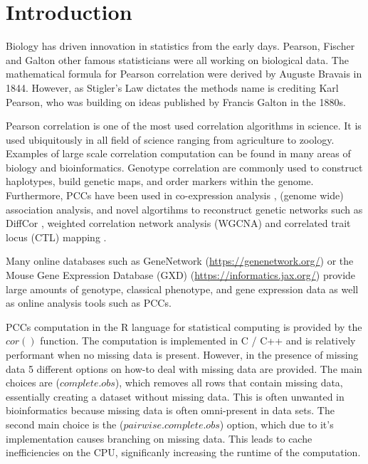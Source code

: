 \documentclass{bioinfo}
\begin{document}
\maketitle

\section{Introduction}
Biology has driven innovation in statistics from the early days. Pearson, Fischer 
and Galton other famous statisticians were all working on biological data. The 
mathematical formula for Pearson correlation were derived by Auguste Bravais in 
1844. However, as Stigler's Law \citep{Stigler1980} dictates the methods name is 
crediting Karl Pearson, who was building on ideas published by Francis Galton in 
the 1880s. 

Pearson correlation is one of the most used correlation algorithms in science. 
It is used ubiquitously in all field of science ranging from agriculture to 
zoology. Examples of large scale correlation computation can be found in many 
areas of biology and bioinformatics. Genotype correlation are commonly used to 
construct haplotypes, build genetic maps, and order markers within the genome. 
Furthermore, PCCs have been used in co-expression analysis \citep{Tesson:2010}, 
(genome wide) association analysis, and novel algortihms to reconstruct genetic 
networks such as DiffCor \citep{Fukushima:2013}, weighted correlation network 
analysis (WGCNA) \citep{Horvath:2008} and correlated trait locus (CTL) mapping 
\citep{Arends2016a}.

Many online databases such as GeneNetwork 
(\href{https://genenetwork.org/}{https://genenetwork.org/}) \citep{Sloan2016} or 
the Mouse Gene Expression Database (GXD) 
(\href{https://informatics.jax.org/}{https://informatics.jax.org/}) \citep{Finger2017}
provide large amounts of genotype, classical phenotype, and gene expression data as 
well as online analysis tools such as PCCs.

PCCs computation in the R language for statistical computing \citep{R:2005} is 
provided by the $cor()$ function. The computation is implemented in C / C++ and 
is relatively performant when no missing data is present. However, 
in the presence of missing data 5 different options on how-to deal 
with missing data are provided. The main choices are ($complete.obs$), 
which removes all rows that contain missing data, essentially 
creating a dataset without missing data. This is often unwanted in 
bioinformatics because missing data is often omni-present in data 
sets. The second main choice is the ($pairwise.complete.obs$) option, 
which due to it's implementation causes branching on missing data. This
leads to cache inefficiencies on the CPU, significanly increasing the 
runtime of the computation.
\end{document}
